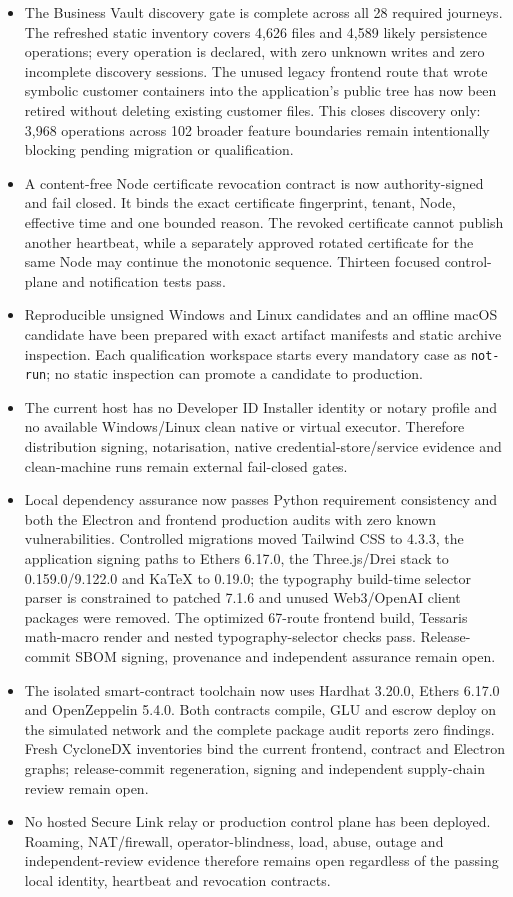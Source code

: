 \documentclass[11pt]{article}
\newcommand{\code}[1]{\texttt{#1}}
\begin{document}
\begin{itemize}
  \item The Business Vault discovery gate is complete across all 28 required journeys. The refreshed static inventory covers 4,626 files and 4,589 likely persistence operations; every operation is declared, with zero unknown writes and zero incomplete discovery sessions. The unused legacy frontend route that wrote symbolic customer containers into the application's public tree has now been retired without deleting existing customer files. This closes discovery only: 3,968 operations across 102 broader feature boundaries remain intentionally blocking pending migration or qualification.
  \item A content-free Node certificate revocation contract is now authority-signed and fail closed. It binds the exact certificate fingerprint, tenant, Node, effective time and one bounded reason. The revoked certificate cannot publish another heartbeat, while a separately approved rotated certificate for the same Node may continue the monotonic sequence. Thirteen focused control-plane and notification tests pass.
  \item Reproducible unsigned Windows and Linux candidates and an offline macOS candidate have been prepared with exact artifact manifests and static archive inspection. Each qualification workspace starts every mandatory case as \code{not-run}; no static inspection can promote a candidate to production.
  \item The current host has no Developer ID Installer identity or notary profile and no available Windows/Linux clean native or virtual executor. Therefore distribution signing, notarisation, native credential-store/service evidence and clean-machine runs remain external fail-closed gates.
  \item Local dependency assurance now passes Python requirement consistency and both the Electron and frontend production audits with zero known vulnerabilities. Controlled migrations moved Tailwind CSS to 4.3.3, the application signing paths to Ethers 6.17.0, the Three.js/Drei stack to 0.159.0/9.122.0 and KaTeX to 0.19.0; the typography build-time selector parser is constrained to patched 7.1.6 and unused Web3/OpenAI client packages were removed. The optimized 67-route frontend build, Tessaris math-macro render and nested typography-selector checks pass. Release-commit SBOM signing, provenance and independent assurance remain open.
  \item The isolated smart-contract toolchain now uses Hardhat 3.20.0, Ethers 6.17.0 and OpenZeppelin 5.4.0. Both contracts compile, GLU and escrow deploy on the simulated network and the complete package audit reports zero findings. Fresh CycloneDX inventories bind the current frontend, contract and Electron graphs; release-commit regeneration, signing and independent supply-chain review remain open.
  \item No hosted Secure Link relay or production control plane has been deployed. Roaming, NAT/firewall, operator-blindness, load, abuse, outage and independent-review evidence therefore remains open regardless of the passing local identity, heartbeat and revocation contracts.
\end{itemize}
\end{document}
